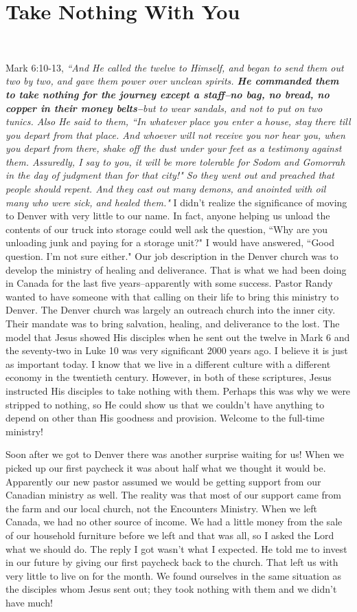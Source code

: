 \documentclass[oneside]{book}
\begin{document}
\section{Take Nothing With You}
\

Mark 6:10-13, \textit{``And He called the twelve to Himself, and began to send them out two by two, and gave them power over unclean spirits. \textbf{He commanded them to take nothing for the journey except a staff--no bag, no bread, no copper in their money belts--}but to wear sandals, and not to put on two tunics. Also He said to them, ``In whatever place you enter a house, stay there till you depart from that place. And whoever will not receive you nor hear you, when you depart from there, shake off the dust under your feet as a testimony against them. Assuredly, I say to you, it will be more tolerable for Sodom and Gomorrah in the day of judgment than for that city!" So they went out and preached that people should repent. And they cast out many demons, and anointed with oil many who were sick, and healed them."}
I didn't realize the significance of moving to Denver with very little to our name. In fact, anyone helping us unload the contents of our truck into storage could well ask the question, ``Why are you unloading junk and paying for a storage unit?" I would have answered, ``Good question. I'm not sure either." Our job description in the Denver church was to develop the ministry of healing and deliverance. That is what we had been doing in Canada for the last five years--apparently with some success. Pastor Randy wanted to have someone with that calling on their life to bring this ministry to Denver. The Denver church was largely an outreach church into the inner city. Their mandate was to bring salvation, healing, and deliverance to the lost. The model that Jesus showed His disciples when he sent out the twelve in Mark 6 and the seventy-two in Luke 10 was very significant 2000 years ago. I believe it is just as important today. I know that we live in a different culture with a different economy in the twentieth century. However, in both of these scriptures, Jesus instructed His disciples to take nothing with them. Perhaps this was why we were stripped to nothing, so He could show us that we couldn't have anything to depend on other than His goodness and provision. Welcome to the full-time ministry!

Soon after we got to Denver there was another surprise waiting for us! When we picked up our first paycheck it was about half what we thought it would be. Apparently our new pastor assumed we would be getting support from our Canadian ministry as well. The reality was that most of our support came from the farm and our local church, not the Encounters Ministry. When we left Canada, we had no other source of income. We had a little money from the sale of our household furniture before we left and that was all, so I asked the Lord what we should do. The reply I got wasn't what I expected. He told me to invest in our future by giving our first paycheck back to the church. That left us with very little to live on for the month. We found ourselves in the same situation as the disciples whom Jesus sent out; they took nothing with them and we didn't have much!
\end{document}
